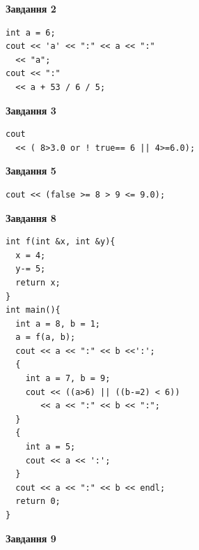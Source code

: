 \documentclass[12pt, ukrainian]{article}
\begin{document}
{\begin {large}
\begin{minipage}[t]{7.0cm}
\end{minipage}
\vline \hspace{1mm}
\begin{minipage}[t]{11.0cm}

\begin{center}
\textbf{Завдання 2}
\end{center}
\vspace{-8mm}

\begin{verbatim}
int a = 6;
cout << 'a' << ":" << a << ":" 
  << "a";
cout << ":" 
  << a + 53 / 6 / 5;
\end{verbatim}



\begin{center}
\textbf{Завдання 3}
\end{center}
\vspace{-8mm}

\begin{verbatim}
cout 
  << ( 8>3.0 or ! true== 6 || 4>=6.0);
\end{verbatim}



\begin{center}
\textbf{Завдання 5}
\end{center}
\vspace{-8mm}

\begin{verbatim}
cout << (false >= 8 > 9 <= 9.0);
\end{verbatim}



\begin{center}
\textbf{Завдання 8}
\end{center}
\vspace{-8mm}

\begin{verbatim}
int f(int &x, int &y){
  x = 4;
  y-= 5;
  return x;
}
int main(){
  int a = 8, b = 1;
  a = f(a, b);
  cout << a << ":" << b <<':';
  {
    int a = 7, b = 9;
    cout << ((a>6) || ((b-=2) < 6))
       << a << ":" << b << ":";
  }
  {
    int a = 5;
    cout << a << ':';
  }
  cout << a << ":" << b << endl;
  return 0;
}
\end{verbatim}

\end{minipage}


\begin{minipage}[t]{7.0cm}

\begin{center}
\textbf{Завдання 9}
\end{center}
\vspace{-8mm}


\end{minipage}
\end{large}}
\end{document}
